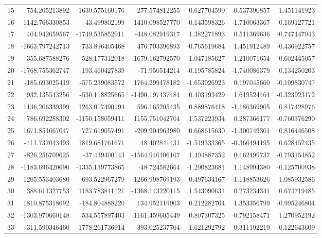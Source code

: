 \begin{longtable}{rrrrrrr}
15 & -754.265213892 & -1630.575160176 & -277.574812255 & 0.627704590 & -0.537390857 & 1.451141923 \\
16 & 1142.766330853 & 43.499802199 & 1410.098527770 & -0.143598326 & -1.710063367 & 0.169127721 \\
17 & 404.942659567 & -1749.535852911 & -448.082919317 & 1.382271893 & 0.511369636 & -0.747447943 \\
18 & -1663.797242713 & -733.896405468 & 476.703396893 & -0.765619684 & 1.451912489 & -0.436922757 \\
19 & -355.687588276 & 528.177312018 & -1679.162792570 & -1.047185627 & 1.210071654 & 0.602445057 \\
20 & -1768.755362747 & 193.460427839 & -71.950514214 & -0.195785824 & -1.740086379 & 0.134250203 \\
21 & -185.693025419 & -575.239083572 & 1764.299478182 & -1.653926923 & 0.197045660 & -0.109830747 \\
22 & 932.135543256 & -530.118825665 & -1490.197437484 & 0.403193429 & 1.619524464 & -0.323923172 \\
23 & 1136.206339399 & 1263.017490194 & 596.165205435 & 0.889876418 & -1.186369905 & 0.817428976 \\
24 & 786.692288302 & -1150.158059411 & 1155.751042704 & 1.537223934 & 0.287366177 & -0.760376290 \\
25 & 1671.851667047 & 727.619057491 & -209.904963980 & 0.668615630 & -1.300749301 & 0.816446508 \\
26 & -411.737043493 & 1819.681761671 & 48.402841431 & -1.519333365 & -0.360494195 & 0.628452435 \\
27 & -826.256709625 & -37.439400143 & -1564.946106167 & 1.494887352 & 0.162499737 & -0.793154852 \\
28 & -1183.696420690 & -1335.139773865 & -48.724582664 & -1.290823681 & 1.148994380 & -0.125700938 \\
29 & -1205.553403680 & 693.522967279 & 1266.998769193 & 0.497634167 & -1.118853626 & 1.085932586 \\
30 & 388.611327753 & 1183.783811121 & -1368.143220115 & 1.543090631 & 0.273234341 & 0.674719485 \\
31 & 1810.875318692 & -184.804888220 & 134.952119903 & 0.212282764 & 1.353356799 & -0.995246804 \\
32 & -1303.970660148 & 534.557897403 & 1161.459605449 & 0.807307325 & -0.792158471 & 1.270952192 \\
33 & -311.590346460 & -1778.261736914 & -393.025237704 & -1.621292792 & 0.311192219 & -0.122643609 \\

\end{longtable}
